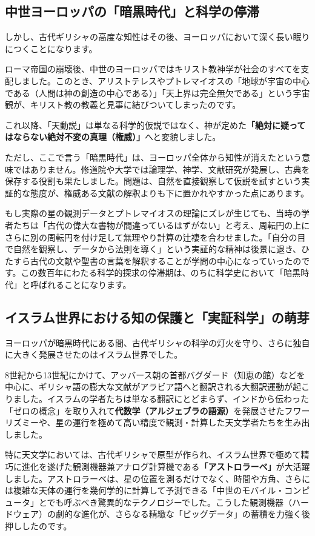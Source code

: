\subsection{中世ヨーロッパの「暗黒時代」と科学の停滞}

しかし、古代ギリシャの高度な知性はその後、ヨーロッパにおいて深く長い眠りにつくことになります。

ローマ帝国の崩壊後、中世のヨーロッパではキリスト教神学が社会のすべてを支配しました。このとき、アリストテレスやプトレマイオスの「地球が宇宙の中心である（人間は神の創造の中心である）」「天上界は完全無欠である」という宇宙観が、キリスト教の教義と見事に結びついてしまったのです。

これ以降、「天動説」は単なる科学的仮説ではなく、神が定めた\textbf{「絶対に疑ってはならない絶対不変の真理（権威）」}へと変貌しました。

ただし、ここで言う「暗黒時代」は、ヨーロッパ全体から知性が消えたという意味ではありません。修道院や大学では論理学、神学、文献研究が発展し、古典を保存する役割も果たしました。問題は、自然を直接観察して仮説を試すという実証的な態度が、権威ある文献の解釈よりも下に置かれやすかった点にあります。

もし実際の星の観測データとプトレマイオスの理論にズレが生じても、当時の学者たちは「古代の偉大な書物が間違っているはずがない」と考え、周転円の上にさらに別の周転円を付け足して無理やり計算の辻褄を合わせました。「自分の目で自然を観察し、データから法則を導く」という実証的な精神は後景に退き、ひたすら古代の文献や聖書の言葉を解釈することが学問の中心になっていったのです。この数百年にわたる科学的探求の停滞期は、のちに科学史において「暗黒時代」と呼ばれることになります。

\subsection{イスラム世界における知の保護と「実証科学」の萌芽}

ヨーロッパが暗黒時代にある間、古代ギリシャの科学の灯火を守り、さらに独自に大きく発展させたのはイスラム世界でした。

8世紀から13世紀にかけて、アッバース朝の首都バグダード（知恵の館）などを中心に、ギリシャ語の膨大な文献がアラビア語へと翻訳される大翻訳運動が起こりました。イスラムの学者たちは単なる翻訳にとどまらず、インドから伝わった「ゼロの概念」を取り入れて\textbf{代数学（アルジェブラの語源）}を発展させたフワーリズミーや、星の運行を極めて高い精度で観測・計算した天文学者たちを生み出しました。

特に天文学においては、古代ギリシャで原型が作られ、イスラム世界で極めて精巧に進化を遂げた観測機器兼アナログ計算機である\textbf{「アストロラーベ」}が大活躍しました。アストロラーベは、星の位置を測るだけでなく、時間や方角、さらには複雑な天体の運行を幾何学的に計算して予測できる「中世のモバイル・コンピュータ」とでも呼ぶべき驚異的なテクノロジーでした。こうした観測機器（ハードウェア）の劇的な進化が、さらなる精緻な「ビッグデータ」の蓄積を力強く後押ししたのです。

